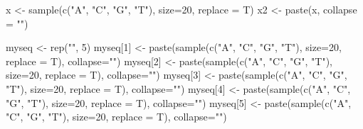 \documentclass[
]{book}
\newenvironment{Shaded}{\begin{snugshade}}{\end{snugshade}}
\newcommand{\AttributeTok}[1]{\textcolor[rgb]{0.77,0.63,0.00}{#1}}
\newcommand{\DecValTok}[1]{\textcolor[rgb]{0.00,0.00,0.81}{#1}}
\newcommand{\FunctionTok}[1]{\textcolor[rgb]{0.00,0.00,0.00}{#1}}
\newcommand{\NormalTok}[1]{#1}
\newcommand{\OtherTok}[1]{\textcolor[rgb]{0.56,0.35,0.01}{#1}}
\newcommand{\StringTok}[1]{\textcolor[rgb]{0.31,0.60,0.02}{#1}}
\begin{document}
\begin{Shaded}
\begin{Highlighting}[]

\NormalTok{x }\OtherTok{\textless{}{-}} \FunctionTok{sample}\NormalTok{(}\FunctionTok{c}\NormalTok{(}\StringTok{"A"}\NormalTok{, }\StringTok{"C"}\NormalTok{, }\StringTok{"G"}\NormalTok{, }\StringTok{"T"}\NormalTok{), }\AttributeTok{size=}\DecValTok{20}\NormalTok{, }\AttributeTok{replace =}\NormalTok{ T)}
\NormalTok{x2 }\OtherTok{\textless{}{-}} \FunctionTok{paste}\NormalTok{(x, }\AttributeTok{collapse =} \StringTok{""}\NormalTok{)}

\NormalTok{myseq }\OtherTok{\textless{}{-}} \FunctionTok{rep}\NormalTok{(}\StringTok{""}\NormalTok{, }\DecValTok{5}\NormalTok{)}
\NormalTok{myseq[}\DecValTok{1}\NormalTok{] }\OtherTok{\textless{}{-}} \FunctionTok{paste}\NormalTok{(}\FunctionTok{sample}\NormalTok{(}\FunctionTok{c}\NormalTok{(}\StringTok{"A"}\NormalTok{, }\StringTok{"C"}\NormalTok{, }\StringTok{"G"}\NormalTok{, }\StringTok{"T"}\NormalTok{), }\AttributeTok{size=}\DecValTok{20}\NormalTok{, }\AttributeTok{replace =}\NormalTok{ T), }\AttributeTok{collapse=}\StringTok{""}\NormalTok{)}
\NormalTok{myseq[}\DecValTok{2}\NormalTok{] }\OtherTok{\textless{}{-}} \FunctionTok{paste}\NormalTok{(}\FunctionTok{sample}\NormalTok{(}\FunctionTok{c}\NormalTok{(}\StringTok{"A"}\NormalTok{, }\StringTok{"C"}\NormalTok{, }\StringTok{"G"}\NormalTok{, }\StringTok{"T"}\NormalTok{), }\AttributeTok{size=}\DecValTok{20}\NormalTok{, }\AttributeTok{replace =}\NormalTok{ T), }\AttributeTok{collapse=}\StringTok{""}\NormalTok{)}
\NormalTok{myseq[}\DecValTok{3}\NormalTok{] }\OtherTok{\textless{}{-}} \FunctionTok{paste}\NormalTok{(}\FunctionTok{sample}\NormalTok{(}\FunctionTok{c}\NormalTok{(}\StringTok{"A"}\NormalTok{, }\StringTok{"C"}\NormalTok{, }\StringTok{"G"}\NormalTok{, }\StringTok{"T"}\NormalTok{), }\AttributeTok{size=}\DecValTok{20}\NormalTok{, }\AttributeTok{replace =}\NormalTok{ T), }\AttributeTok{collapse=}\StringTok{""}\NormalTok{)}
\NormalTok{myseq[}\DecValTok{4}\NormalTok{] }\OtherTok{\textless{}{-}} \FunctionTok{paste}\NormalTok{(}\FunctionTok{sample}\NormalTok{(}\FunctionTok{c}\NormalTok{(}\StringTok{"A"}\NormalTok{, }\StringTok{"C"}\NormalTok{, }\StringTok{"G"}\NormalTok{, }\StringTok{"T"}\NormalTok{), }\AttributeTok{size=}\DecValTok{20}\NormalTok{, }\AttributeTok{replace =}\NormalTok{ T), }\AttributeTok{collapse=}\StringTok{""}\NormalTok{)}
\NormalTok{myseq[}\DecValTok{5}\NormalTok{] }\OtherTok{\textless{}{-}} \FunctionTok{paste}\NormalTok{(}\FunctionTok{sample}\NormalTok{(}\FunctionTok{c}\NormalTok{(}\StringTok{"A"}\NormalTok{, }\StringTok{"C"}\NormalTok{, }\StringTok{"G"}\NormalTok{, }\StringTok{"T"}\NormalTok{), }\AttributeTok{size=}\DecValTok{20}\NormalTok{, }\AttributeTok{replace =}\NormalTok{ T), }\AttributeTok{collapse=}\StringTok{""}\NormalTok{)}



\end{Highlighting}
\end{Shaded}
\end{document}
